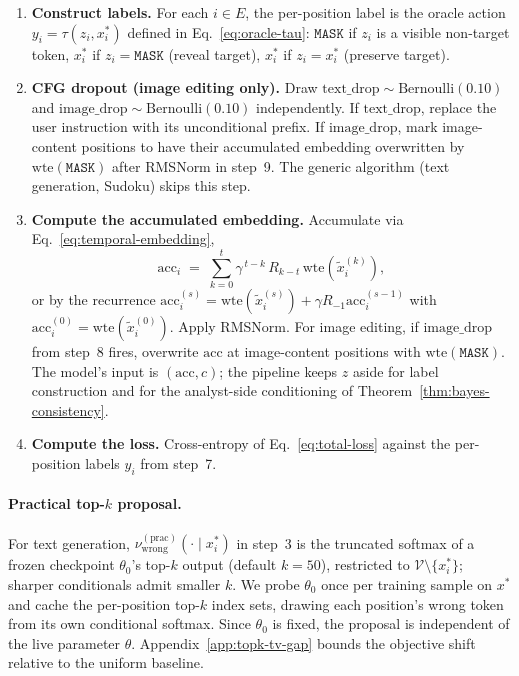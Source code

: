 \documentclass{llmxive}
\providecommand{\xstar}{x^{\ast}}
\providecommand{\mask}{\texttt{MASK}}
\begin{document}
\begin{enumerate}
    \item \textbf{Construct labels.} For each $i \in E$, the per-position label is the oracle action $y_i = \tau(z_i, \xstar_i)$ defined in Eq.~\eqref{eq:oracle-tau}: $\mask$ if $z_i$ is a visible non-target token, $\xstar_i$ if $z_i = \mask$ (reveal target), $\xstar_i$ if $z_i = \xstar_i$ (preserve target).

    \item \textbf{CFG dropout (image editing only).} Draw $\text{text\_drop} \sim \mathrm{Bernoulli}(0.10)$ and $\text{image\_drop} \sim \mathrm{Bernoulli}(0.10)$ independently. If $\text{text\_drop}$, replace the user instruction with its unconditional prefix. If $\text{image\_drop}$, mark image-content positions to have their accumulated embedding overwritten by $\mathrm{wte}(\mask)$ after RMSNorm in step~9. The generic algorithm (text generation, Sudoku) skips this step.

    \item \textbf{Compute the accumulated embedding.} Accumulate via Eq.~\eqref{eq:temporal-embedding},
    \[
    \mathrm{acc}_i \;=\; \textstyle\sum_{k=0}^{t} \gamma^{\,t-k}\, R_{k-t}\, \mathrm{wte}(\tilde{x}_i^{(k)}),
    \]
    or by the recurrence $\mathrm{acc}_i^{(s)} = \mathrm{wte}(\tilde{x}_i^{(s)}) + \gamma R_{-1} \mathrm{acc}_i^{(s-1)}$ with $\mathrm{acc}_i^{(0)} = \mathrm{wte}(\tilde{x}_i^{(0)})$. Apply RMSNorm. For image editing, if $\text{image\_drop}$ from step~8 fires, overwrite $\mathrm{acc}$ at image-content positions with $\mathrm{wte}(\mask)$. The model's input is $(\mathrm{acc}, c)$; the pipeline keeps $z$ aside for label construction and for the analyst-side conditioning of Theorem~\ref{thm:bayes-consistency}.

    \item \textbf{Compute the loss.} Cross-entropy of Eq.~\eqref{eq:total-loss} against the per-position labels $y_i$ from step~7.
\end{enumerate}

\paragraph{Practical top-\texorpdfstring{$k$}{k} proposal.}
For text generation, $\nu^{(\mathrm{prac})}_{\mathrm{wrong}}(\cdot \mid \xstar_i)$ in step~3 is the truncated softmax of a frozen checkpoint $\theta_0$'s top-$k$ output (default $k = 50$), restricted to $\mathcal{V} \setminus \{\xstar_i\}$; sharper conditionals admit smaller $k$. We probe $\theta_0$ once per training sample on $\xstar$ and cache the per-position top-$k$ index sets, drawing each position's wrong token from its own conditional softmax. Since $\theta_0$ is fixed, the proposal is independent of the live parameter $\theta$. Appendix~\ref{app:topk-tv-gap} bounds the objective shift relative to the uniform baseline.
\end{document}
